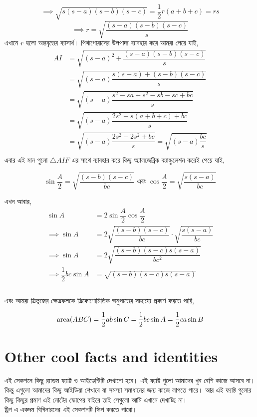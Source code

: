 \documentclass[12pt]{article}
\begin{document}
$$\implies \sqrt{s(s-a)(s-b)(s-c)} = \dfrac{1}{2} r(a+b+c) = rs$$
$$\implies r = \sqrt{\dfrac{(s-a)(s-b)(s-c)}{s}}$$
এখানে $r$ হলো অন্তবৃত্তের ব্যাসার্ধ। পিথাগোরাসের উপপাদ্য ব্যাবহার করে আমরা পেয়ে যাই,
\begin{align*}
    AI &= \sqrt{(s-a)^2 + \dfrac{(s-a)(s-b)(s-c)}{s}}\\
    &= \sqrt{(s-a)\dfrac{s(s-a)+(s-b)(s-c)}{s}}\\
    &= \sqrt{(s-a)\dfrac{s^2 - sa + s^2 - sb- sc+bc}{s}}\\
    &= \sqrt{(s-a)\dfrac{2s^2 - s(a+b+c)+bc}{s}}\\
    &= \sqrt{(s-a)\dfrac{2s^2 - 2s^2+bc}{s}} = \sqrt{(s-a)\dfrac{bc}{s}}\\
\end{align*}
এবার এই মান গুলো $\triangle AIF$ এর সাথে ব্যাবহার করে কিছু অ্যালজেব্রিক ক্যাল্কুলেশন করেই 
পেয়ে যাই,
\begin{theom*}
    $$\sin \frac A2 = \sqrt{\dfrac{(s-b)(s-c)}{bc}} \text{ এবং } 
    \cos\frac A2 = \sqrt{\dfrac{s(s-a)}{bc}}$$
\end{theom*}
এখন আবার, \begin{align*}
    \sin A &= 2\sin\dfrac A2 \cos\dfrac A2\\
    \implies \sin A &= 2\sqrt{\dfrac{(s-b)(s-c)}{bc}} \cdot \sqrt{\dfrac{s(s-a)}{bc}}\\
    \implies \sin A &= 2\sqrt{\dfrac{(s-b)(s-c)s(s-a)}{bc^2}}\\
    \implies \dfrac 1 2 bc\sin A &= \sqrt{(s-b)(s-c)s(s-a)}\\
\end{align*}
$\qquad$\\
এবং আমরা ত্রিভুজের ক্ষেত্রফলকে ত্রিকোণোমিতিক অনুপাতের সাহায্যে প্রকাশ করতে পারি,
\begin{theom*}
    $$\operatorname{area}(ABC) = \dfrac 12 ab\sin C = \dfrac 12 bc\sin A = \dfrac 12 ca\sin B$$
\end{theom*}


\section{Other cool facts and identities}
এই সেকশনে কিছু র‍্যান্ডম ফ্যাক্ট ও আইডেন্টিটি দেখানো হবে। এই ফ্যাক্ট গুলো আমাদের খুব বেশি কাজে আসবে না। 
কিন্তু এগুলো আমাদের কিছু আইডিয়া শেখাবে যা সমস্যা সমাধানের জন্য কাজে লাগতে পারে। আর এই ফ্যাক্ট গুলোর 
কিছু কিছুর প্রমাণ এই নোটের স্কোপের বাইরে তাই সেগুলো আমি এখানে দেখাচ্ছি না।\\
ট্রিগ এ একদম বিগিনারদের এই সেকশনটি স্কিপ করতে পারো। 
\end{document}

